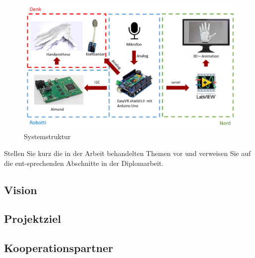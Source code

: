\documentclass{article}
\begin{document}
\begin{figure}[h]
    \includegraphics[width=1\textwidth]{Systemstruktur.png}
    \centering
    \caption{Systemstruktur}
    \label{Systemstruktur}
\end{figure}

Stellen Sie kurz die in der Arbeit behandelten Themen vor und verweisen Sie auf die ent-sprechenden Abschnitte in der Diplomarbeit.\\
\color{black}

\subsection{Vision}
\subsection{Projektziel}
\subsection{Kooperationspartner}

\newpage
\end{document}
